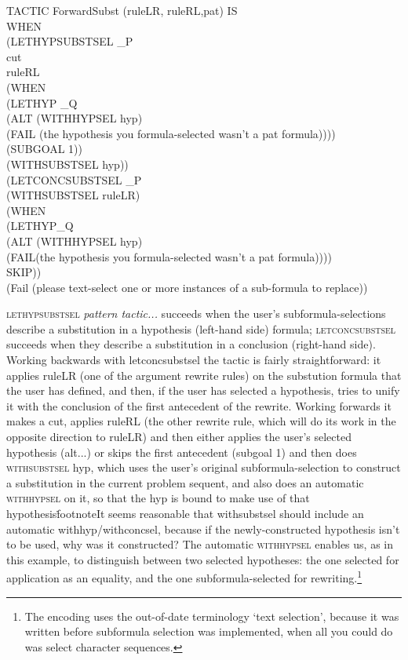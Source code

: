 \begin{japeish}
TACTIC ForwardSubst (ruleLR, ruleRL,pat) IS\\
\tab WHEN \\
\tab \tab (LETHYPSUBSTSEL \_P \\
\tab \tab \tab cut\\
\tab \tab \tab ruleRL \\
\tab \tab \tab (WHEN \\
\tab \tab \tab \tab (LETHYP \_Q \\
\tab \tab \tab \tab \tab (ALT (WITHHYPSEL hyp) \\
\tab \tab \tab \tab \tab \tab (FAIL (the hypothesis you formula-selected wasn't a pat formula))))\\
\tab \tab \tab \tab (SUBGOAL 1)) \\
\tab \tab \tab (WITHSUBSTSEL hyp))\\
\tab \tab (LETCONCSUBSTSEL \_P\\
\tab \tab \tab (WITHSUBSTSEL ruleLR)\\
\tab \tab \tab (WHEN \\
\tab \tab \tab \tab (LETHYP\_Q \\
\tab \tab \tab \tab \tab (ALT (WITHHYPSEL hyp) \\
\tab \tab \tab \tab \tab \tab (FAIL(the hypothesis you formula-selected wasn't a pat formula))))\\
\tab \tab \tab \tab SKIP))\\
\tab \tab (Fail (please text-select one or more instances of a sub-formula to replace))
\end{japeish}

\textsc{lethypsubstsel} \textit{pattern tactic...} succeeds when the user's subformula-selections describe a substitution in a hypothesis (left-hand side) formula; \textsc{letconcsubstsel} succeeds when they describe a substitution in a conclusion (right-hand side). Working backwards with letconcsubstsel the tactic is fairly straightforward: it applies ruleLR (one of the argument rewrite rules) on the substution formula that the user has defined, and then, if the user has selected a hypothesis, tries to unify it with the conclusion of the first antecedent of the rewrite. Working forwards it makes a cut, applies ruleRL (the other rewrite rule, which will do its work in the opposite direction to ruleLR) and then either applies the user's selected hypothesis (alt...) or skips the first antecedent (subgoal 1) and then does \textsc{withsubstsel} hyp, which uses the user's original subformula-selection to construct a substitution in the current problem sequent, and also does an automatic \textsc{withhypsel} on it, so that the hyp is bound to make use of that hypothesis\.footnote{It seems reasonable that withsubstsel should include an automatic withhyp/withconcsel, because if the newly-constructed hypothesis isn't to be used, why was it constructed?} The automatic \textsc{withhypsel} enables us, as in this example, to distinguish between two selected hypotheses: the one selected for application as an equality, and the one subformula-selected for rewriting.\footnote{The encoding uses the out-of-date terminology `text selection', because it was written before subformula selection was implemented, when all you could do was select character sequences.}

